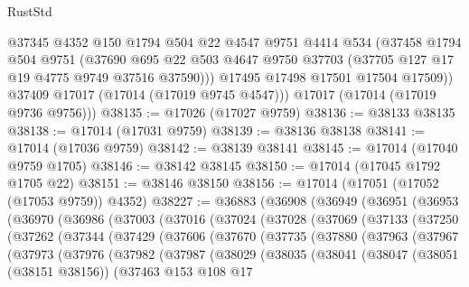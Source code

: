 \begin{lexlean}{RustStd}
\begin{coremodule}
{\begin{coremodule}
{{{{{{{{{{{{{{{{{{{{{{{{{{{{{{{{{{{{{{{{{{{{{{{{{{{{{{{            @37345
            @4352
            @150
            @1794
            @504
            @22
            @4547
            @9751
            @4414
            @534
            (@37458
              @1794
              @504
              @9751
              (@37690
                @695
                @22
                @503
                @4647
                @9750
                @37703
                (@37705 @127 @17 @19 @4775 @9749 @37516 @37590)))
            @17495
            @17498
            @17501
            @17504
            @17509))
        @37409
        @17017
        (@17014 (@17019 @9745 @4547)))
      @17017
      (@17014 (@17019 @9736 @9756)))
@38135 := @17026 (@17027 @9759)
@38136 := @38133 @38135
@38138 := @17014 (@17031 @9759)
@38139 := @38136 @38138
@38141 := @17014 (@17036 @9759)
@38142 := @38139 @38141
@38145 := @17014 (@17040 @9759 @1705)
@38146 := @38142 @38145
@38150 := @17014 (@17045 @1792 @1705 @22)
@38151 := @38146 @38150
@38156 := @17014 (@17051 (@17052 (@17053 @9759)) @4352)
@38227 := @36883
    (@36908
      (@36949
        (@36951
          (@36953
            (@36970
              (@36986
                (@37003
                  (@37016
                    (@37024
                      (@37028
                        (@37069
                          (@37133
                            (@37250
                              (@37262
                                (@37344
                                  (@37429
                                    (@37606
                                      (@37670
                                        (@37735
                                          (@37880
                                            (@37963
                                              (@37967
                                                (@37973
                                                  (@37976
                                                    (@37982
                                                      (@37987
                                                        (@38029
                                                          (@38035
                                                            (@38041
                                                              (@38047
                                                                (@38051 (@38151 @38156))
                                                                (@37463
                                                                  @153
                                                                  @108
                                                                  @17
}}}}}}}}}}}}}}}}}}}}}}}}}}}}}}}}}}}}}}}}}}}}}}}}}}}}}}}
\end{coremodule}}
\end{coremodule}
\end{lexlean}
